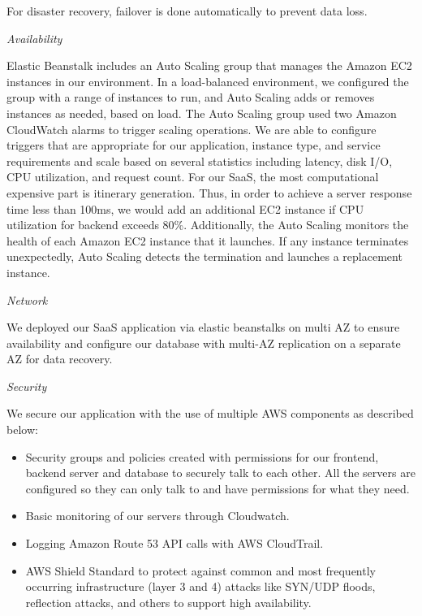 \documentclass[12pt,a4paper]{article}
\begin{document}
            For disaster recovery,  failover is done automatically to prevent data loss.
            
            \textit{Availability}
            
            Elastic Beanstalk includes an Auto Scaling group that manages the Amazon EC2 instances in our environment. In a load-balanced environment, we configured the group with a range of instances to run, and Auto Scaling adds or removes instances as needed, based on load. The Auto Scaling group used two Amazon CloudWatch alarms to trigger scaling operations. We are able to configure triggers that are appropriate for our application, instance type, and service requirements and scale based on several statistics including latency, disk I/O, CPU utilization, and request count. For our SaaS, the most computational expensive part is itinerary generation. Thus, in order to achieve a server response time less than 100ms, we would add an additional EC2 instance if CPU utilization for backend exceeds 80\%. Additionally, the Auto Scaling monitors the health of each Amazon EC2 instance that it launches. If any instance terminates unexpectedly, Auto Scaling detects the termination and launches a replacement instance.

            \textit{Network}
            
            We deployed our SaaS application via elastic beanstalks on multi AZ to ensure availability and configure our database with multi-AZ replication on a separate AZ for data recovery.
            
            \textit{Security}
            
            We secure our application with the use of multiple AWS components as described below:
            \begin{itemize}
                \item Security groups and policies created with permissions for our frontend, backend server and database to securely talk to each other. All the servers are configured so they can only talk to and have permissions for what they need.
                \item Basic monitoring of our servers through Cloudwatch.
                \item Logging Amazon Route 53 API calls with AWS CloudTrail.
                \item AWS Shield Standard to protect against common and most frequently occurring infrastructure (layer 3 and 4) attacks like SYN/UDP floods, reflection attacks, and others to support high availability.
            \end{itemize}
            
\end{document}
